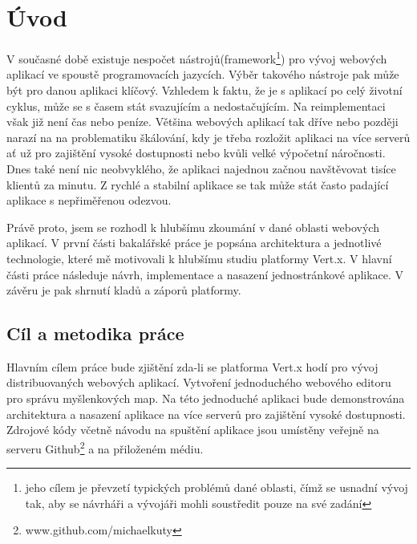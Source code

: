 

\chapter{Úvod}

V současné době existuje nespočet nástrojů(framework\footnote{jeho cílem je převzetí typických problémů dané oblasti, čímž se usnadní vývoj tak, aby se návrháři a vývojáři mohli soustředit pouze na své zadání}) pro vývoj webových aplikací ve spoustě programovacích jazycích. 
Výběr takového nástroje pak může být pro danou aplikaci klíčový. Vzhledem k faktu, že je s aplikací po celý životní cyklus, může se s časem stát svazujícím a nedostačujícím. Na reimplementaci však již není čas nebo peníze. Většina webových aplikací tak dříve nebo později narazí na na problematiku škálování, kdy je třeba rozložit aplikaci na více serverů ať už pro zajištění vysoké dostupnosti nebo kvůli velké výpočetní náročnosti. Dnes také není nic neobvyklého, že aplikaci najednou začnou navštěvovat tisíce klientů za minutu. Z rychlé a stabilní aplikace se tak může stát často padající aplikace s nepřiměřenou odezvou.

Právě proto, jsem se rozhodl k hlubšímu zkoumání v dané oblasti webových aplikací. V první části bakalářské práce je popsána architektura a jednotlivé technologie, které mě motivovali k hlubšímu studiu platformy Vert.x. V hlavní části práce následuje návrh, implementace a nasazení jednostránkové aplikace. V závěru je pak shrnutí kladů a záporů platformy.

\section{Cíl a metodika práce}

Hlavním cílem práce bude zjištění zda-li se platforma Vert.x hodí pro vývoj distribuovaných webových aplikací. 
Vytvoření jednoduchého webového editoru pro správu myšlenkových map. %
Na této jednoduché aplikaci bude demonstrována architektura a nasazení aplikace na více serverů pro zajištění vysoké dostupnosti.
Zdrojové kódy včetně návodu na spuštění aplikace jsou umístěny veřejně na serveru Github\footnote{www.github.com/michaelkuty} a na přiloženém médiu.

